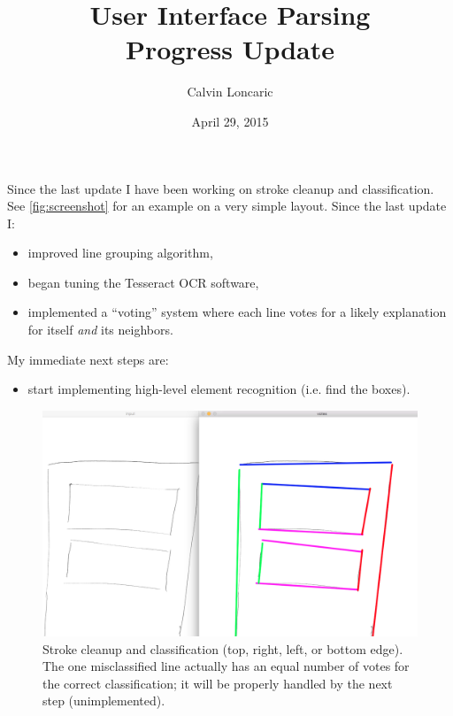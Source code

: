 \documentclass{article}
\title{User Interface Parsing \\ \small{Progress Update}}
\author{Calvin Loncaric}
\date{April 29, 2015}
\begin{document}
\maketitle

\noindent Since the last update I have been working on stroke cleanup and
classification. See \autoref{fig:screenshot} for an example on a very simple
layout. Since the last update I:
\begin{itemize}
\item improved line grouping algorithm,
\item began tuning the Tesseract OCR software,
\item implemented a ``voting'' system where each line votes for a likely
    explanation for itself \emph{and} its neighbors.
\end{itemize}

\noindent My immediate next steps are:
\begin{itemize}
\item start implementing high-level element recognition (i.e. find the boxes).
\end{itemize}

\begin{figure}
    \includegraphics[width=\textwidth]{progress-2015-04-29-screenshot.png}
    \caption{Stroke cleanup and classification (top, right, left, or bottom
        edge). The one misclassified line actually has an equal number of votes
        for the correct classification; it will be properly handled by the next
        step (unimplemented).}
    \label{fig:screenshot}
\end{figure}
\end{document}
